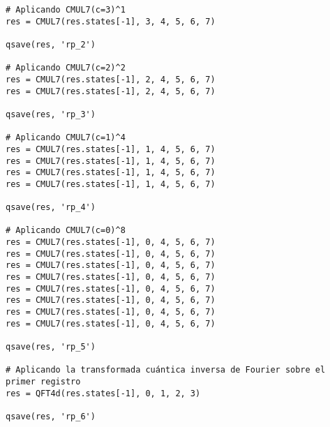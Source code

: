\begin{verbatim}
# Aplicando CMUL7(c=3)^1
res = CMUL7(res.states[-1], 3, 4, 5, 6, 7)

qsave(res, 'rp_2')

# Aplicando CMUL7(c=2)^2
res = CMUL7(res.states[-1], 2, 4, 5, 6, 7)
res = CMUL7(res.states[-1], 2, 4, 5, 6, 7)

qsave(res, 'rp_3')

# Aplicando CMUL7(c=1)^4
res = CMUL7(res.states[-1], 1, 4, 5, 6, 7)
res = CMUL7(res.states[-1], 1, 4, 5, 6, 7)
res = CMUL7(res.states[-1], 1, 4, 5, 6, 7)
res = CMUL7(res.states[-1], 1, 4, 5, 6, 7)

qsave(res, 'rp_4')

# Aplicando CMUL7(c=0)^8
res = CMUL7(res.states[-1], 0, 4, 5, 6, 7)
res = CMUL7(res.states[-1], 0, 4, 5, 6, 7)
res = CMUL7(res.states[-1], 0, 4, 5, 6, 7)
res = CMUL7(res.states[-1], 0, 4, 5, 6, 7)
res = CMUL7(res.states[-1], 0, 4, 5, 6, 7)
res = CMUL7(res.states[-1], 0, 4, 5, 6, 7)
res = CMUL7(res.states[-1], 0, 4, 5, 6, 7)
res = CMUL7(res.states[-1], 0, 4, 5, 6, 7)

qsave(res, 'rp_5')

# Aplicando la transformada cuántica inversa de Fourier sobre el primer registro
res = QFT4d(res.states[-1], 0, 1, 2, 3)

qsave(res, 'rp_6')

\end{verbatim}

